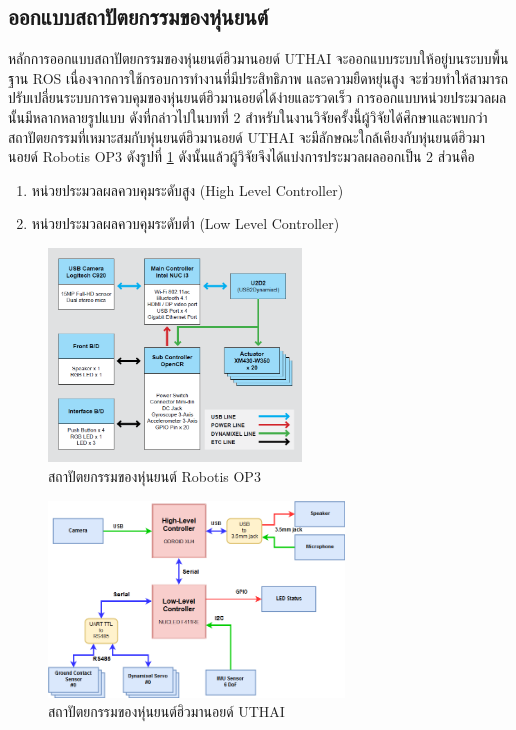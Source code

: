 \subsection{ออกแบบสถาปัตยกรรมของหุ่นยนต์}
หลักการออกแบบสถาปัตยกรรมของหุ่นยนต์ฮิวมานอยด์ UTHAI จะออกแบบระบบให้อยู่บนระบบพื้นฐาน ROS
เนื่องจากการใช้กรอบการทำงานที่มีประสิทธิภาพ และความยืดหยุ่นสูง จะช่วยทำให้สามารถปรับเปลี่ยนระบบการควบคุมของหุ่นยนต์ฮิวมานอยด์ได้ง่ายและรวดเร็ว
การออกแบบหน่วยประมวลผลนั้นมีหลากหลายรูปแบบ ดังที่กล่าวไปในบทที่ 2 สำหรับในงานวิจัยครั้งนี้ผู้วิจัยได้ศึกษาและพบกว่าสถาปัตยกรรมที่เหมาะสมกับหุ่นยนต์ฮิวมานอยด์ UTHAI
จะมีลักษณะใกล้เคียงกับหุ่นยนต์ฮิวมานอยด์ Robotis OP3 ดังรูปที่ \ref{fig:op3_argitec} ดังนั้นแล้วผู้วิจัยจึงได้แบ่งการประมวลผลออกเป็น 2 ส่วนคือ
\begin{enumerate}[label=\arabic*, leftmargin=1.5cm]\setlength\itemsep{-0.25em}
	\item หน่วยประมวลผลควบคุมระดับสูง (High Level Controller)
	\item หน่วยประมวลผลควบคุมระดับต่ำ (Low Level Controller)
\end{enumerate}
\begin{figure}[!ht]
	\centering
	\includegraphics[width=0.6\textwidth]{chapter3/images/op3_029.png}
	\caption{สถาปัตยกรรมของหุ่นยนต์ Robotis OP3}
	\label{fig:op3_argitec}
\end{figure}
\begin{figure}[!ht]
	\centering
	\includegraphics[width=0.7\textwidth]{chapter3/images/uthai_argitec.png}
	\caption{สถาปัตยกรรมของหุ่นยนต์ฮิวมานอยด์ UTHAI}
	\label{fig:uthai_argitec}
\end{figure}

